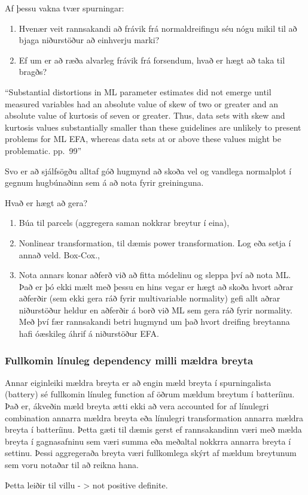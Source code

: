 \documentclass[]{book}
\providecommand{\tightlist}{%
  \setlength{\itemsep}{0pt}\setlength{\parskip}{0pt}}
\begin{document}
Af þessu vakna tvær spurningar:

\begin{enumerate}
\def\labelenumi{\arabic{enumi})}
\tightlist
\item
  Hvenær veit rannsakandi að frávik frá normaldreifingu séu nógu mikil til að bjaga niðurstöður að einhverju marki?
\item
  Ef um er að ræða alvarleg frávik frá forsendum, hvað er hægt að taka til bragðs?
\end{enumerate}

``Substantial distortions in ML parameter estimates did not emerge until measured variables had an absolute value of skew of two or greater and an absolute value of kurtosis of seven or greater. Thus, data sets with skew and kurtosis values substantially smaller than these guidelines are unlikely to present problems for ML EFA, whereas data sets at or above these values might be problematic. pp.~99''

Svo er að sjálfsögðu alltaf góð hugmynd að skoða vel og vandlega normalplot í gegnum hugbúnaðinn sem á að nota fyrir greininguna.

Hvað er hægt að gera?

\begin{enumerate}
\def\labelenumi{\arabic{enumi})}
\item
  Búa til parcels (aggregera saman nokkrar breytur í eina),
\item
  Nonlinear transformation, til dæmis power transformation. Log eða setja í annað veld. Box-Cox.,
\item
  Nota annars konar aðferð við að fitta módelinu og sleppa því að nota ML. Það er þó ekki mælt með þessu en hins vegar er hægt að skoða hvort aðrar aðferðir (sem ekki gera ráð fyrir multivariable normality) gefi allt aðrar niðurstöður heldur en aðferðir á borð við ML sem gera ráð fyrir normality. Með því fær rannsakandi betri hugmynd um það hvort dreifing breytanna hafi óæskileg áhrif á niðurstöður EFA.
\end{enumerate}

\hypertarget{fullkomin-luxednuleg-dependency-milli-muxe6ldra-breyta}{%
\subsubsection{Fullkomin línuleg dependency milli mældra breyta}\label{fullkomin-luxednuleg-dependency-milli-muxe6ldra-breyta}}

Annar eiginleiki mældra breyta er að engin mæld breyta í spurningalista (battery) sé fullkomin línuleg function af öðrum mældum breytum í batteríinu. Það er, ákveðin mæld breyta ætti ekki að vera accounted for af línulegri combination annarra mældra breyta eða línulegri transformation annarra mældra breyta í batteríinu. Þetta gæti til dæmis gerst ef rannsakandinn væri með mælda breyta í gagnasafninu sem væri summa eða meðaltal nokkrra annarra breyta í settinu. Þessi aggregeraða breyta væri fullkomlega skýrt af mældum breytunum sem voru notaðar til að reikna hana.

Þetta leiðir til villu - \textgreater{} not positive definite.


\end{document}
